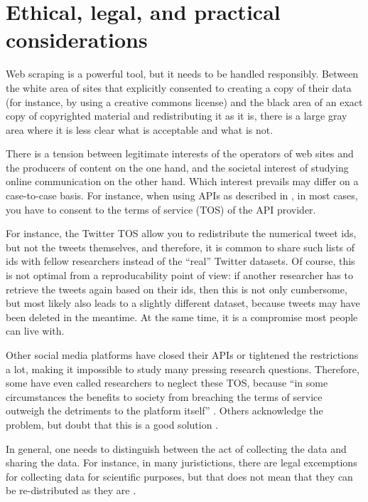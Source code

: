 \section{Ethical, legal, and practical considerations}
\label{sec:ethicallegalpractical}
Web scraping is a powerful tool, but it needs to be handled
responsibly. Between the white area of sites that explicitly consented
to creating a copy of their data (for instance, by using a creative
commons license) and the black area of an exact copy of copyrighted
material and redistributing it as it is, there is a large gray area
where it is less clear what is acceptable and what is not.

There is a tension between legitimate interests of the operators of
web sites and the producers of content on the one hand, and the
societal interest of studying online communication on the other
hand. Which interest prevails may differ on a case-to-case basis. For
instance, when using APIs as described in , in most
cases, you have to consent to the terms of service (TOS) of the API
provider.

For instance, the Twitter TOS allow you to redistribute the numerical
tweet ids, but not the tweets themselves, and therefore, it is common
to share such lists of ids with fellow researchers instead of the
``real'' Twitter datasets. Of course, this is not optimal from a
reproducability point of view: if another researcher has to retrieve
the tweets again based on their ids, then this is not only cumbersome,
but most likely also leads to a slightly different dataset, because
tweets may have been deleted in the meantime. At the same time, it is
a compromise most people can live with.

Other social media platforms have closed their APIs or tightened the
restrictions a lot, making it impossible to study many pressing
research questions. Therefore, some have even called researchers to
neglect these TOS, because ``in some circumstances the benefits to
society from breaching the terms of service outweigh the detriments to
the platform itself'' \citep[p.~1561]{Bruns2019}. Others acknowledge
the problem, but doubt that this is a good solution
\citep{Puschmann2019}.

In general, one needs to distinguish between the act of collecting the
data and sharing the data. For instance, in many juristictions, there
are legal excemptions for collecting data for scientific purposes, but
that does not mean that they can be re-distributed as they are
\citep{VanAtteveldt2019}.

